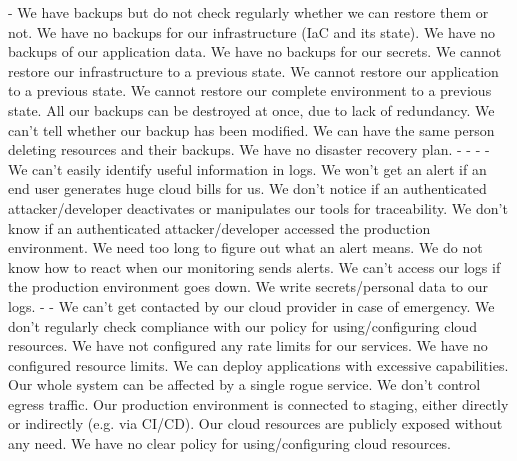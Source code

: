 %
 {-}
 {We have backups but do not check regularly whether we can restore them or not.}
 {We have no backups for our infrastructure (IaC and its state).}
 {We have no backups of our application data.}
 {We have no backups for our secrets.}
 {We cannot restore our infrastructure to a previous state.}
 {We cannot restore our application to a previous state.}
 {We cannot restore our complete environment to a previous state.}
 {All our backups can be destroyed at once, due to lack of redundancy.}
 {We can't tell whether our backup has been modified.}
 {We can have the same person deleting resources and their backups.}
 {We have no disaster recovery plan.}
%
 {-}
 {-}
 {-}
 {-}
 {We can't easily identify useful information in logs.}
 {We won't get an alert if an end user generates huge cloud bills for us.}
 {We don't notice if an authenticated attacker/developer deactivates or manipulates our tools for traceability.}
 {We don't know if an authenticated attacker/developer accessed the production environment.}
 {We need too long to figure out what an alert means.}
 {We do not know how to react when our monitoring sends alerts.}
 {We can't access our logs if the production environment goes down.}
 {We write secrets/personal data to our logs.}
%
 {-}
 {-}
 {We can't get contacted by our cloud provider in case of emergency.}
 {We don't regularly check compliance with our policy for using/configuring cloud resources.}
 {We have not configured any rate limits for our services.}
 {We have no configured resource limits.}
 {We can deploy applications with excessive capabilities.}
 {Our whole system can be affected by a single rogue service.}
 {We don't control egress traffic.}
 {Our production environment is connected to staging, either directly or indirectly (e.g. via CI/CD).}
 {Our cloud resources are publicly exposed without any need.}
 {We have no clear policy for using/configuring cloud resources.}
